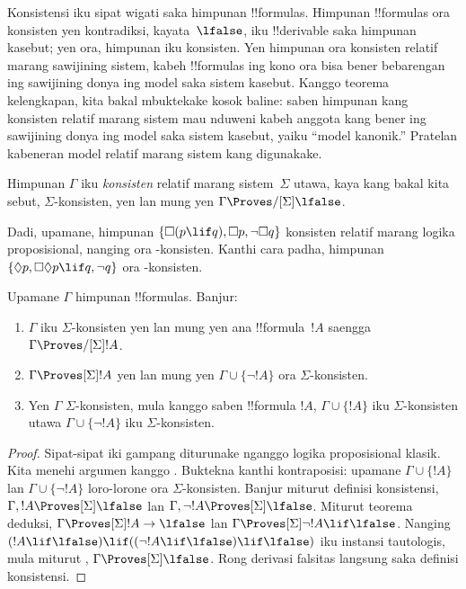 \documentclass[../../../include/open-logic-section]{subfiles}
\begin{document}


Konsistensi iku sipat wigati saka himpunan !!{formula}s. Himpunan
!!{formula}s ora konsisten yen kontradiksi, kayata~$\lfalse$, iku
!!{derivable} saka himpunan kasebut; yen ora, himpunan iku konsisten.
Yen himpunan ora konsisten relatif marang sawijining sistem,
kabeh !!{formula}s ing kono ora bisa bener bebarengan ing sawijining
donya ing model saka sistem kasebut. Kanggo teorema kelengkapan, kita
bakal mbuktekake kosok baline: saben himpunan kang konsisten relatif
marang sistem mau nduweni kabeh anggota kang bener ing sawijining donya
ing model saka sistem kasebut, yaiku
``model kanonik.'' Pratelan kabeneran model relatif marang sistem kang digunakake.

\begin{defn}
  Himpunan $\Gamma$ iku \emph{konsisten} relatif marang sistem~$\Sigma$
  utawa, kaya kang bakal kita sebut, $\Sigma$-konsisten, yen lan mung yen $\Gamma
  \Proves/[\Sigma] \lfalse$.
\end{defn}

Dadi, upamane, himpunan $\{ \Box(p \lif q), \Box p, \lnot\Box q \}$
konsisten relatif marang logika proposisional, nanging ora
-konsisten. Kanthi cara padha, himpunan $\{ \Diamond p, \Box\Diamond
p \lif q, \lnot q \}$ ora -konsisten.

\begin{prop}
  Upamane $\Gamma$ himpunan !!{formula}s. Banjur:
  \begin{enumerate}
  \item $\Gamma$ iku $\Sigma$-konsisten yen lan mung yen ana
    !!{formula}~$!A$ saengga $\Gamma \Proves/[\Sigma]
    !A$.
  \item {}%
    $\Gamma \Proves[\Sigma] !A$ yen lan mung yen $\Gamma \cup \{
    \lnot!A \}$ ora $\Sigma$-konsisten.
  \item {}%
    Yen $\Gamma$ $\Sigma$-konsisten, mula kanggo saben !!{formula}
    $!A$, $\Gamma \cup \{ !A \}$ iku
    $\Sigma$-konsisten utawa $\Gamma \cup \{ \lnot!A \}$ iku
    $\Sigma$-konsisten.
  \end{enumerate}
\end{prop}

\begin{proof}
  Sipat-sipat iki gampang diturunake nganggo logika proposisional klasik.
  Kita menehi argumen kanggo . Buktekna
  kanthi kontraposisi: upamane $\Gamma \cup \{ !A \}$ lan
  $\Gamma \cup \{ \lnot!A \}$ loro-lorone ora $\Sigma$-konsisten. Banjur
  miturut definisi konsistensi, $\Gamma, !A \Proves[\Sigma]
  \lfalse$ lan $\Gamma, \lnot !A \Proves[\Sigma] \lfalse$. Miturut
  teorema deduksi, $\Gamma \Proves[\Sigma] !A \to \lfalse$ lan
  $\Gamma \Proves[\Sigma] \lnot!A \lif \lfalse$. Nanging $(!A \lif
  \lfalse) \lif ((\lnot!A \lif \lfalse) \lif \lfalse)$ iku
  instansi tautologis, mula miturut
  ,
  $\Gamma \Proves[\Sigma] \lfalse$.
Rong derivasi falsitas langsung saka definisi konsistensi.
\end{proof}
\end{document}
